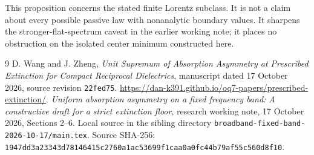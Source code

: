 \documentclass[11pt]{article}
\begin{document}
This proposition concerns the stated finite Lorentz subclass. It is not a
claim about every possible passive law with nonanalytic boundary values.
It sharpens the stronger-flat-spectrum caveat in the earlier working note;
it places no obstruction on the isolated center minimum constructed here.

\begin{thebibliography}{9}
D. Wang and J. Zheng,
\emph{Unit Supremum of Absorption Asymmetry at Prescribed Extinction for
Compact Reciprocal Dielectrics}, manuscript dated 17 October 2026,
source revision \texttt{22fed75}.
\url{https://dan-k391.github.io/oq7-papers/prescribed-extinction/}.
\emph{Uniform absorption asymmetry on a fixed frequency band:
A constructive draft for a strict extinction floor},
research working note, 17 October 2026, Sections 2--6.
Local source in the sibling directory
\texttt{broadband-fixed-band-2026-10-17/main.tex}.
Source SHA-256:
\texttt{1947dd3a23343d78146415c2760a1ac53699f1caa0a0fc44b79af55c560d8f10}.
\end{thebibliography}
\end{document}
